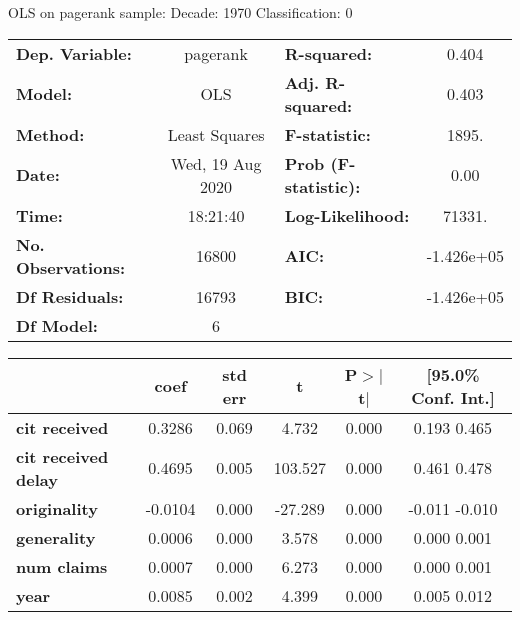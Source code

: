 
OLS on pagerank sample: Decade: 1970 Classification: 0
\begin{center}
\begin{tabular}{lclc}
\toprule
\textbf{Dep. Variable:}     &     pagerank     & \textbf{  R-squared:         } &      0.404    \\
\textbf{Model:}             &       OLS        & \textbf{  Adj. R-squared:    } &      0.403    \\
\textbf{Method:}            &  Least Squares   & \textbf{  F-statistic:       } &      1895.    \\
\textbf{Date:}              & Wed, 19 Aug 2020 & \textbf{  Prob (F-statistic):} &      0.00     \\
\textbf{Time:}              &     18:21:40     & \textbf{  Log-Likelihood:    } &     71331.    \\
\textbf{No. Observations:}  &       16800      & \textbf{  AIC:               } &  -1.426e+05   \\
\textbf{Df Residuals:}      &       16793      & \textbf{  BIC:               } &  -1.426e+05   \\
\textbf{Df Model:}          &           6      & \textbf{                     } &               \\
\bottomrule
\end{tabular}
\begin{tabular}{lccccc}
                            & \textbf{coef} & \textbf{std err} & \textbf{t} & \textbf{P$>$$|$t$|$} & \textbf{[95.0\% Conf. Int.]}  \\
\midrule
\textbf{cit received}       &       0.3286  &        0.069     &     4.732  &         0.000        &         0.193     0.465       \\
\textbf{cit received delay} &       0.4695  &        0.005     &   103.527  &         0.000        &         0.461     0.478       \\
\textbf{originality}        &      -0.0104  &        0.000     &   -27.289  &         0.000        &        -0.011    -0.010       \\
\textbf{generality}         &       0.0006  &        0.000     &     3.578  &         0.000        &         0.000     0.001       \\
\textbf{num claims}         &       0.0007  &        0.000     &     6.273  &         0.000        &         0.000     0.001       \\
\textbf{year}               &       0.0085  &        0.002     &     4.399  &         0.000        &         0.005     0.012       \\

\end{tabular}
\end{center}
